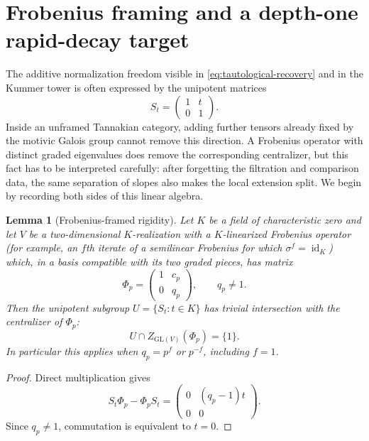 \documentclass[11pt]{article}
\newtheorem{lemma}[theorem]{Lemma}
\theoremstyle{definition}
\theoremstyle{remark}
\begin{document}
\section{Frobenius framing and a depth-one rapid-decay target}
\label{sec:frobenius-framing}

The additive normalization freedom visible in
\eqref{eq:tautological-recovery} and in the Kummer tower is often expressed
by the unipotent matrices
\[
 S_t=\begin{pmatrix}1&t\\0&1\end{pmatrix}.
\]
Inside an unframed Tannakian category, adding further tensors already fixed
by the motivic Galois group cannot remove this direction.  A Frobenius
operator with distinct graded eigenvalues does remove the corresponding
centralizer, but this fact has to be interpreted carefully: after forgetting
the filtration and comparison data, the same separation of slopes also makes
the local extension split.  We begin by recording both sides of this linear
algebra.

\begin{lemma}[Frobenius-framed rigidity]
\label{lem:frobenius-framed-rigidity}
Let $K$ be a field of characteristic zero and let $V$ be a two-dimensional
$K$-realization with a $K$-linearized Frobenius operator (for example, an
$f$th iterate of a semilinear Frobenius for which
$\sigma^f=\operatorname{id}_K$) which, in a basis compatible with its two
graded pieces, has matrix
\begin{equation}\label{eq:frobenius-matrix}
 \Phi_p=\begin{pmatrix}1&c_p\\0&q_p\end{pmatrix},
 \qquad q_p\ne1.
\end{equation}
Then the unipotent subgroup $U=\{S_t:t\in K\}$ has trivial intersection
with the centralizer of $\Phi_p$:
\begin{equation}\label{eq:frobenius-centralizer}
 U\cap Z_{\mathrm{GL}(V)}(\Phi_p)=\{1\}.
\end{equation}
In particular this applies when $q_p=p^f$ or $p^{-f}$, including $f=1$.
\end{lemma}

\begin{proof}
Direct multiplication gives
\[
 S_t\Phi_p-\Phi_pS_t
 =\begin{pmatrix}0&(q_p-1)t\\0&0\end{pmatrix}.
\]
Since $q_p\ne1$, commutation is equivalent to $t=0$.
\end{proof}
\end{document}
